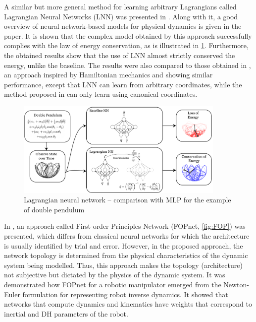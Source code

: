 A similar but more general method for learning arbitrary Lagrangians called Lagrangian Neural Networks (LNN) was presented in \cite{Cranmer2020}. Along with it, a good overview of neural network-based models for physical dynamics is given in the paper. It is shown that the complex model obtained by this approach successfully complies with the law of energy conservation, as is illustrated in \cref{fig:LagrangianNN}. Furthermore, the obtained results show that the use of LNN almost strictly conserved the energy, unlike the baseline. The results were also compared to those obtained in \cite{Greydanus2019}, an approach inspired by Hamiltonian mechanics and showing similar performance, except that LNN can learn from arbitrary coordinates, while the method proposed in \cite{Greydanus2019} can only learn using canonical coordinates.

\begin{figure}
    \centering
    \includegraphics[width=0.9\textwidth]{slike/lnn.png}
    \caption[Lagrangian neural network]{Lagrangian neural network -- comparison with MLP for the example of double pendulum \cite{Cranmer2020}}
    \label{fig:LagrangianNN}
\end{figure}

In \cite{Ledezma2017}, an approach called First-order Principles Network (FOPnet, \cref{fig:FOP}) was presented, which differs from classical neural networks for which the architecture is usually identified by trial and error. However, in the proposed approach, the network topology is determined from the physical characteristics of the dynamic system being modelled. Thus, this approach makes the topology (architecture) not subjective but dictated by the physics of the dynamic system. It was demonstrated how FOPnet for a robotic manipulator emerged from the Newton-Euler formulation for representing robot inverse dynamics. It showed that networks that compute dynamics and kinematics have weights that correspond to inertial and DH parameters of the robot.

